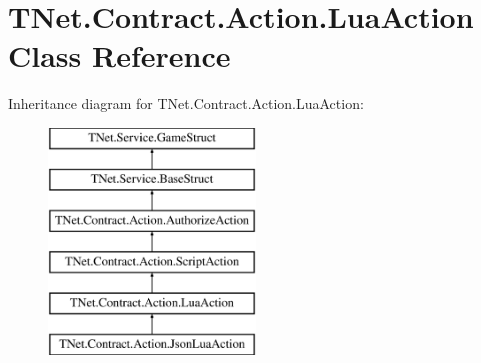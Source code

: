 \hypertarget{class_t_net_1_1_contract_1_1_action_1_1_lua_action}{}\section{T\+Net.\+Contract.\+Action.\+Lua\+Action Class Reference}
\label{class_t_net_1_1_contract_1_1_action_1_1_lua_action}
Inheritance diagram for T\+Net.\+Contract.\+Action.\+Lua\+Action\+:\begin{figure}[H]
\begin{center}
\leavevmode
\includegraphics[height=6.000000cm]{class_t_net_1_1_contract_1_1_action_1_1_lua_action}
\end{center}
\end{figure}
